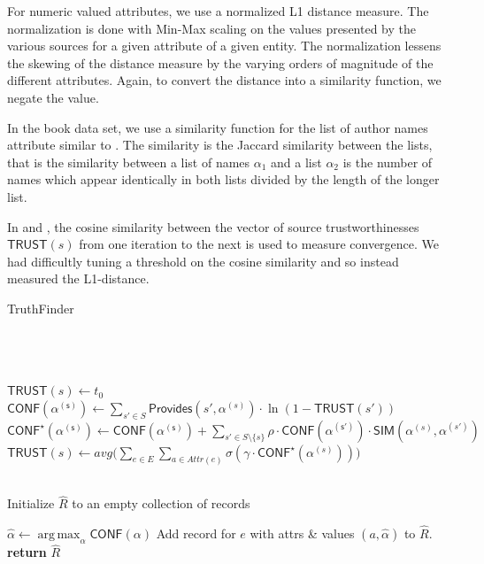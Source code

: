 \documentclass{acm_proc_article-sp}
\DeclareMathOperator*{\argmax}{arg\,max}
\begin{document}
For numeric valued attributes, we use a normalized L1 distance measure. The normalization is done with Min-Max scaling on the values presented by the various sources for a given attribute of a given entity. The normalization lessens the skewing of the distance measure by the varying orders of magnitude of the different attributes. Again, to convert the distance into a similarity function, we negate the value. 

In the book data set, we use a similarity function for the list of author names  attribute similar to \cite{dong:integrating}. The similarity is the Jaccard similarity between the lists, that is  the similarity between a list of names $\alpha_1$ and a list $\alpha_2$  is the number of names which appear identically in both lists divided by the length of the longer list. 

In \cite{yin:truth} and \cite{waguih:truth}, the cosine similarity between the vector of source trustworthinesses $\mathsf{TRUST}(s)$ from one iteration to the next is used to measure convergence. We had difficultly tuning a threshold on the cosine similarity and so instead measured the L1-distance. 

\begin{algorithm}
\caption{TruthFinder}
\begin{algorithmic}[1]
\small
{} \\
 \\
 \\

\State $\mathsf{TRUST}(s) \leftarrow t_0$
\EndFor
\\
\State $\mathsf{CONF(\alpha^{(s)})} \leftarrow \sum_{s' \in S} \mathsf{Provides}(s',\alpha^{(s)}) \cdot \ln(1-\mathsf{TRUST}(s'))$
\EndFor
{}
\State $\mathsf{CONF^\star(\alpha^{(s)})} \leftarrow \mathsf{CONF(\alpha^{(s)})} +   \sum_{s' \in S \setminus \{s\}} \rho \cdot \mathsf{CONF(\alpha^{(s')})}  \cdot \mathsf{SIM}(\alpha^{(s)},\alpha^{(s')})$
\EndFor
\EndFor
{}
\State $\mathsf{TRUST}(s) \leftarrow avg \big ( \sum_{e \in E}\sum_{a \in Attr(e)} \sigma(\gamma \cdot \mathsf{CONF}^\star(\alpha^{(s)})) \big )$
\EndFor
\EndWhile

\\
\State Initialize $\hat{R}$ to an empty collection of records

\State $\hat{\alpha} \leftarrow \argmax_{\alpha} \mathsf{CONF}(\alpha)$
\EndFor
\State Add record for $e$ with attrs \& values $(a, \hat{\alpha})$ to $\hat{R}$.
\EndFor
\\

\State \textbf{return} $\hat{R}$
\EndFunction
\end{algorithmic}
\label{alg:tf}
\end{algorithm}  
\end{document}
